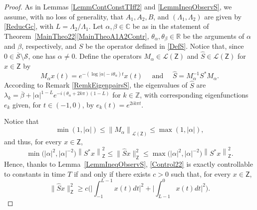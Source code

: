 \documentclass[JEP,XML,SOM,Unicode]{cedram}
\theoremstyle{plain}
\theoremstyle{definition}
\newcommand{\norm}[1]{\left\lVert #1\right\lVert}
\newcommand{\abs}[1]{\left\lvert #1\right \rvert}
\newcommand{\bnorm}[1]{\bigl\lVert #1\bigr\lVert}
\newcommand{\bgabs}[1]{\biggl\lvert #1\biggr \rvert}
\begin{document}
\begin{proof}
As in Lemmas \ref{LemmContConstTIff2} and \ref{LemmIneqObservS}, we assume, with no loss of generality, that $A_1, A_2, B$, and $(\Lambda_1, \Lambda_2)$ are given by \eqref{ReducGc}, with $L = \Lambda_2 / \Lambda_1$. Let $\alpha, \beta \in \mathbb C$ be as in the statement of Theorem~\ref{MainTheo22}\eqref{MainTheoA1A2Contr}, $\theta_\alpha, \theta_\beta \in \mathbb R$ be the arguments of $\alpha$ and $\beta$, respectively, and $S$ be the operator defined in \eqref{DefS}. Notice that, since $0 \in \overline{\mathcal S}\setminus \mathcal S$, one has $\alpha \neq 0$. Define the operators $M_\alpha \in \mathcal L(\mathsf Z)$ and $\widehat S \in \mathcal L(\mathsf Z)$ for $x \in \mathsf Z$ by
\[M_\alpha x(t) = e^{-(\log\abs{\alpha} - i \theta_\alpha) t} x(t) \quad \text{ and } \quad \widehat S = M_{\alpha}^{-1} S^\ast M_\alpha.\]
According to Remark \ref{RemkEigenpairsS}, the eigenvalues of $\widehat S$ are $\lambda_k = \overline\beta + \abs{\alpha}^{1 - L} e^{- i (\theta_\alpha + 2 k \pi)(1 - L)}$ for $k \in \mathbb Z$, with corresponding eigenfunctions $e_k$ given, for $t \in (-1, 0)$, by $e_k(t) = e^{2 i k \pi t}$.

Notice that
\[
\min(1, \abs{\alpha}) \leq \norm{M_\alpha}_{\mathcal L(\mathsf Z)} \leq \max(1, \abs{\alpha}),
\]
and thus, for every $x \in \mathsf Z$,
\[
\min\bigl(\abs{\alpha}^2, \abs{\alpha}^{-2}\bigr) \norm{S^\ast x}_{\mathsf Z}^2 \leq \bnorm{\widehat S x}_{\mathsf Z}^2 \leq \max\bigl(\abs{\alpha}^2, \abs{\alpha}^{-2}\bigr) \norm{S^\ast x}_{\mathsf Z}^2.
\]
Hence, thanks to Lemma~\ref{LemmIneqObservS}, \eqref{Control22} is exactly controllable to constants in time $T$ if and only if there exists $c > 0$ such that, for every $x \in \mathsf Z$,
\begin{equation}
\label{IneqObservSHat}
\bnorm{\widehat S x}_{\mathsf Z}^2 \geq c \biggl(\bgabs{\int_{-1}^{L-1} x(t) dt}^2 + \bgabs{\int_{L-1}^{0} x(t) dt}^2\biggr).
\end{equation}


\end{proof}
\end{document}
